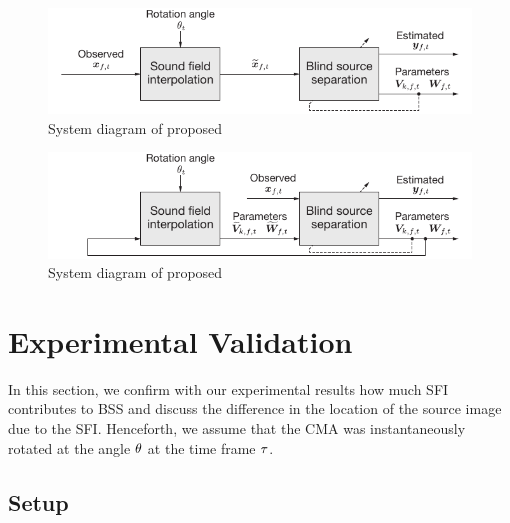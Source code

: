 \documentclass[sip,biber]{now-journal}
\begin{document}
\begin{figure}[t]
  \centering
  \includegraphics{figures/diagrams/sfiiva-o.pdf}
  \caption{System diagram of proposed \SFIIVAo{}}%
  \label{fig:sfiiva-o}
\end{figure}
\begin{figure}[t]
  \centering
  \includegraphics{figures/diagrams/sfiiva-m.pdf}
  \caption{System diagram of proposed \SFIIVAm{}}%
  \label{fig:sfiiva-m}
\end{figure}

\section{Experimental Validation}\label{sec:experiment}
In this section, we confirm with our experimental results how much SFI contributes to BSS and discuss the difference in the location of the source image due to the SFI.
Henceforth, we assume that the CMA was instantaneously rotated at the angle $\theta$ at the time frame $\tau$.

\subsection{Setup}
\end{document}
